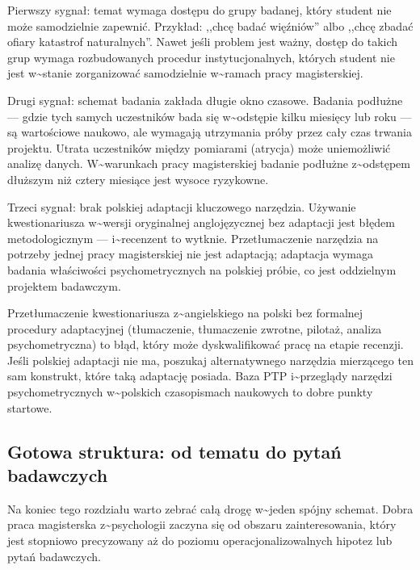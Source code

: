 \documentclass[12pt,a4paper,twoside,openany]{book}
\begin{document}
Pierwszy sygnał: temat wymaga dostępu do grupy badanej, który student nie może samodzielnie zapewnić. Przykład: ,,chcę badać więźniów'' albo ,,chcę zbadać ofiary katastrof naturalnych''. Nawet jeśli problem jest ważny, dostęp do takich grup wymaga rozbudowanych procedur instytucjonalnych, których student nie jest w\textasciitilde{}stanie zorganizować samodzielnie w\textasciitilde{}ramach pracy magisterskiej.


Drugi sygnał: schemat badania zakłada długie okno czasowe. Badania podłużne --- gdzie tych samych uczestników bada się w\textasciitilde{}odstępie kilku miesięcy lub roku --- są wartościowe naukowo, ale wymagają utrzymania próby przez cały czas trwania projektu. Utrata uczestników między pomiarami (atrycja) może uniemożliwić analizę danych. W\textasciitilde{}warunkach pracy magisterskiej badanie podłużne z\textasciitilde{}odstępem dłuższym niż cztery miesiące jest wysoce ryzykowne.


Trzeci sygnał: brak polskiej adaptacji kluczowego narzędzia. Używanie kwestionariusza w\textasciitilde{}wersji oryginalnej anglojęzycznej bez adaptacji jest błędem metodologicznym --- i\textasciitilde{}recenzent to wytknie. Przetłumaczenie narzędzia na potrzeby jednej pracy magisterskiej nie jest adaptacją; adaptacja wymaga badania właściwości psychometrycznych na polskiej próbie, co jest oddzielnym projektem badawczym.


\begin{warningbox} Przetłumaczenie kwestionariusza z\textasciitilde{}angielskiego na polski bez formalnej procedury adaptacyjnej (tłumaczenie, tłumaczenie zwrotne, pilotaż, analiza psychometryczna) to błąd, który może dyskwalifikować pracę na etapie recenzji. Jeśli polskiej adaptacji nie ma, poszukaj alternatywnego narzędzia mierzącego ten sam konstrukt, które taką adaptację posiada. Baza PTP i\textasciitilde{}przeglądy narzędzi psychometrycznych w\textasciitilde{}polskich czasopismach naukowych to dobre punkty startowe.
\end{warningbox}


\subsection{Gotowa struktura: od tematu do pytań badawczych}


Na koniec tego rozdziału warto zebrać całą drogę w\textasciitilde{}jeden spójny schemat. Dobra praca magisterska z\textasciitilde{}psychologii zaczyna się od obszaru zainteresowania, który jest stopniowo precyzowany aż do poziomu operacjonalizowalnych hipotez lub pytań badawczych.
\end{document}
